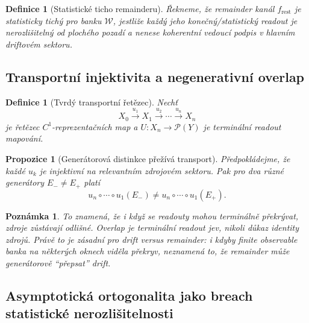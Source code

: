 \documentclass[11pt,a4paper]{article}
\newtheorem{definition}[theorem]{Definice}
\newtheorem{remark}[theorem]{Poznámka}
\newtheorem{proposition}[theorem]{Propozice}
\begin{document}
\begin{definition}[Statistické ticho remainderu]
Řekneme, že remainder kanál \(f_{\mathrm{rest}}\) je \emph{statisticky tichý} pro banku \(\mathcal W\),
jestliže každý jeho konečný/statistický readout je nerozlišitelný od plochého pozadí a nenese
koherentní vedoucí podpis v hlavním driftovém sektoru.
\end{definition}

\subsection*{Transportní injektivita a negenerativní overlap}

\begin{definition}[Tvrdý transportní řetězec]
Nechť
\[
X_0 \xrightarrow{u_1} X_1 \xrightarrow{u_2}\cdots\xrightarrow{u_n} X_n
\]
je řetězec \(C^1\)-reprezentačních map a \(U:X_n\to\mathcal P(Y)\) je terminální readout mapování.
\end{definition}

\begin{proposition}[Generátorová distinkce přežívá transport]
Předpokládejme, že každé \(u_k\) je injektivní na relevantním zdrojovém sektoru. Pak pro dva různé
generátory \(E_-\neq E_+\) platí
\[
u_n\circ\cdots\circ u_1(E_-)\neq u_n\circ\cdots\circ u_1(E_+).
\]
\end{proposition}

\begin{remark}
To znamená, že i když se readouty mohou terminálně překrývat, zdroje zůstávají odlišné.
Overlap je terminální readout jev, nikoli důkaz identity zdrojů.
Právě to je zásadní pro drift versus remainder: i kdyby finite observable banka na některých oknech
viděla překryv, neznamená to, že remainder může generátorově ``přepsat'' drift.
\end{remark}

\subsection*{Asymptotická ortogonalita jako breach statistické nerozlišitelnosti}
\end{document}
